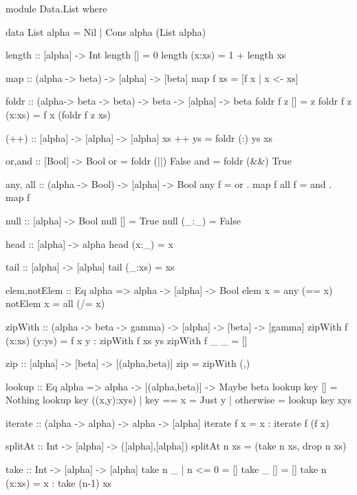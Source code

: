 \begin{code}
module Data.List where

data List alpha = Nil | Cons alpha (List alpha)

length :: [alpha] -> Int
length []      = 0
length (x:xs)  = 1 + length xs

map :: (alpha -> beta) -> [alpha] -> [beta]
map f xs = [f x | x <- xs]

foldr :: (alpha-> beta -> beta) -> beta -> [alpha] -> beta
foldr f z []       = z
foldr f z (x:xs)   = f x (foldr f z xs)

(++) :: [alpha] -> [alpha] -> [alpha]
xs ++ ys = foldr (:) ys xs

or,and :: [Bool] -> Bool
or   = foldr (||)  False
and  = foldr (&&)  True

any, all :: (alpha -> Bool) -> [alpha] -> Bool
any  f = or    . map f
all  f = and   . map f

null :: [alpha] -> Bool
null []     = True
null (_:_)  = False

head :: [alpha] -> alpha
head (x:_) = x

tail :: [alpha] -> [alpha]
tail (_:xs) = xs

elem,notElem :: Eq alpha => alpha -> [alpha] -> Bool
elem     x = any  (==  x)
notElem  x = all  (/=  x)

zipWith :: (alpha -> beta -> gamma) -> [alpha] -> [beta] -> [gamma]
zipWith f (x:xs) (y:ys) = f x y : zipWith f xs ys
zipWith f _ _ = []

zip :: [alpha] -> [beta] -> [(alpha,beta)]
zip = zipWith (,)

lookup :: Eq alpha => alpha -> [(alpha,beta)] -> Maybe beta
lookup key []           =  Nothing
lookup key ((x,y):xys)  | key == x   = Just y
                        | otherwise  = lookup key xys

iterate :: (alpha -> alpha) -> alpha -> [alpha]
iterate f x = x : iterate f (f x)

splitAt :: Int -> [alpha] -> ([alpha],[alpha])
splitAt n xs = (take n xs, drop n xs)

take :: Int -> [alpha] -> [alpha]
take n _  | n <= 0  = []
take _ []           = []
take n (x:xs)       = x : take (n-1) xs


\end{code}
